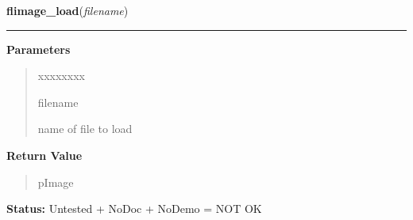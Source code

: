 \hspace{.8\funcindent}\begin{boxedminipage}{\funcwidth}

    \raggedright \textbf{flimage\_load}(\textit{filename})

    \vspace{-1.5ex}

    \rule{\textwidth}{0.5\fboxrule}
\setlength{\parskip}{2ex}
\setlength{\parskip}{1ex}
      \textbf{Parameters}
      \vspace{-1ex}

      \begin{quote}
        \begin{Ventry}{xxxxxxxx}

          \item[filename]

          name of file to load

        \end{Ventry}

      \end{quote}

      \textbf{Return Value}
    \vspace{-1ex}

      \begin{quote}
      pImage

      \end{quote}

\textbf{Status:} Untested + NoDoc + NoDemo = NOT OK



    \end{boxedminipage}

    \label{xformslib:flflimage:flimage_read}

    \vspace{0.5ex}


